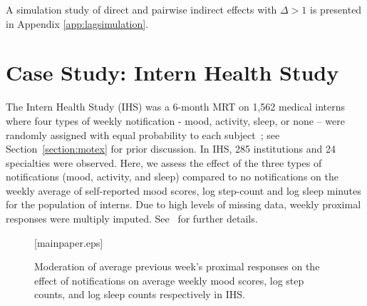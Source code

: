 \documentclass[lineno]{biometrika}
\begin{document}
\noindinet \begin{remark}
A simulation study of direct and pairwise indirect effects with $\Delta>1$ is presented in Appendix \ref{app:lagsimulation}.
\end{remark} 

\section{Case Study: Intern Health Study}
\label{section:casestudy}

The Intern Health Study (IHS) was a 6-month MRT on 1,562 medical interns where four types of weekly notification - mood, activity, sleep, or none -- were randomly assigned with equal probability to each subject~\citep{Necamp2020}; see Section~\ref{section:motex} for prior discussion.
In IHS,  285 institutions and 24 specialties were observed.   Here, we assess the effect of the three types of notifications (mood, activity, and sleep) compared to no notifications on the weekly average of self-reported mood scores, log step-count and log sleep minutes for the population of interns.  
Due to high levels of missing data, weekly proximal responses were multiply imputed.  
See~\cite{Necamp2020} for further details.

\begin{figure}[!th]
  \label{fig:wcls_moderation_IHS}
  \figurebox{15pc}{20pc}{}[mainpaper.eps]
  \caption{Moderation of average previous week's proximal responses on the effect of notifications on average weekly mood scores, log step counts, and log sleep counts respectively in IHS. }
\end{figure}
\end{document}
